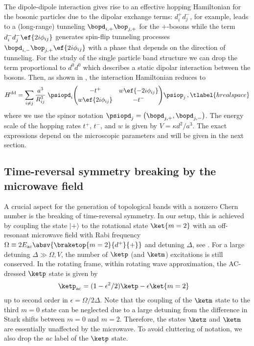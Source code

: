 The dipole-dipole interaction gives rise to an effective hopping Hamiltonian for the bosonic particles due to the dipolar exchange terms:
$d^+_id^-_j$, for example, leads to a (long-range) tunneling $\bopd_{i,+}\bop_{j,+}$ for the ${+}$-bosons while the term $d^-_i d^-_j \ef{2i\phi_{i j}}$ generates spin-flip tunneling processes $\bopd_{i,-}\bop_{j,+} \ef{2i\phi_{ij}}$ with a phase that depends on the direction of tunneling.
For the study of the single particle band structure we can drop the term proportional to $d^0 d^0$ which describes a static dipolar interaction between the bosons.
Then, as shown in , the interaction Hamiltonian reduces to
\begin{align}
    H^{\text{dd}} = \sum_{i\ne j}
    \frac{a^3}{R_{ij}^3}\;
    \psiopd_i\!
    \begingroup
        \renewcommand*{\arraystretch}{1.2}
        \begin{pmatrix}
            -t^+ & w \ef{-2i\phi_{ij}} \\
            w \ef{2i\phi_{ij}} & -t^-
        \end{pmatrix}
    \endgroup\!
    \psiop_j \,,
    \tlabel{hrealspace}
\end{align}
where we use the spinor notation $\psiopd_j = \big( \bopd_{j,+} , \bopd_{j,-} \big)$.
The energy scale of the hopping rates $t^+$, $t^-$, and $w$ is given by $V=\kappa d^2/a^3$. The exact expressions depend on the microscopic parameters and will be given in the next section.

\subsection{Time-reversal symmetry breaking by the microwave field}
A crucial aspect for the generation of topological bands with a nonzero Chern number is the breaking of time-reversal symmetry.
In our setup, this is achieved by coupling the state $|+\rangle$ to the rotational state $\ket{m=2}$ with an off-resonant microwave field with Rabi frequency $\Omega \equiv 2 E_\text{ac} \absv{\braketop{m=2}{d^+}{{+}}}$ and detuning $\Delta$, see .
For a large detuning $\Delta \gg \Omega, V$, the number of $\ketp$ (and $\ketm$) excitations is still conserved.
In the rotating frame, within rotating wave approximation, the AC-dressed $\ketp$ state is given by
\begin{align}
\ketp_\text{ac} &= (1-\epsilon^2/2)\ketp - \epsilon \ket{m=2}
\end{align}
up to second order in $\epsilon=\Omega/2\Delta$.
Note that the coupling of the $\ketm$ state to the third $m=0$ state can be neglected due to a large detuning from the difference in Stark shifts between $m=0$ and $m=2$.
Therefore, the states $\ketz$ and $\ketm$ are essentially unaffected by the microwave.
To avoid cluttering of notation, we also drop the \emph{ac} label of the $\ketp$ state.


